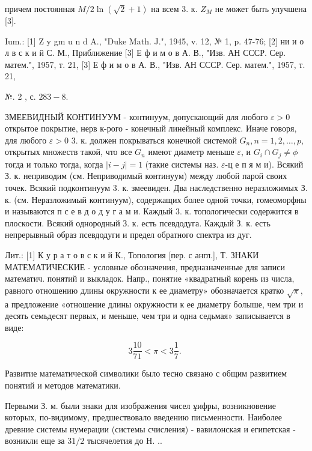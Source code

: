 \documentclass[10pt]{article}
\begin{document}
причем постоянная $M / 2 \ln (\sqrt{2}+1)$ на всем 3. к. $Z_{M}$ не может быть улучшена [3].



Ium.: [1] Z y gm u n d A., "Duke Math. J.", 1945, v. 12, № 1, p. 47-76; [2] ни и о л в с к и й С. М., Приближение [3] Е ф и м о в А. В., "Изв. АН СССР. Сер. матем.", 1957, т. 21, [3] Е ф и м о в А. В., "Изв. АН СССР. Сер. матем.", 1957, т. 21,

№. 2 , с. $283-8$.



ЗМЕЕВИДНЫЙ КОНТИНУУМ - континуум, допускающий для любого $\varepsilon>0$ открытое покрытие, нерв к-рого - конечный линейный комплекс. Иначе говоря, для любого $\varepsilon>0$ 3. к. должен покрываться конечной системой $G_{n}, n=1,2, \ldots, p$, открытых множеств такой, что все $G_{n}$ имеют диаметр меньше $\varepsilon$, и $G_{i} \cap G_{j} \neq \phi$ тогда и только тогда, когда $|i-j|=1$ (такие системы наз. $\varepsilon$-ц е п я м и). Всякий З. к. неприводим (см. Неприводимый континуум) между любой парой своих точек. Всякий подконтинуум 3. к. змеевиден. Два наследственно неразложимых З. к. (см. Неразложимый континуум), содержащих более одной точки, гомеоморфны и называются п с е в д о д у г а м и. Каждый 3. к. топологически содержится в плоскости. Всякий однородный З. к. есть псевдодуга. Каждый З. к. есть непрерывный образ псевдодуги и предел обратного спектра из дуг.



Лит.: [1] К у р а т о в с к и й К., Топология [пер. с англ.], Т. ЗНАКИ МАТЕМАТИЧЕСКИЕ - условные обозначения, предназначенные для записи математич. понятий и выкладок. Напр., понятие «квадратный корень из числа, равного отношению длины окружности к ее диаметру» обозначается кратко $\sqrt{\pi}$, а предложение «отношение длины окружности к ее диаметру болыше, чем три и десять семьдесят первых, и меньше, чем три и одна седьмая» записывается в виде:



\[

3 \frac{10}{71}<\pi<3 \frac{1}{7} \text {. }

\]



Развитие математической символики было тесно связано с общим развитием понятий и методов математики.



Первыми З. м. были знаки для изображения чисел ұифры, возникновение которых, по-видимому, предшествовало введению письменности. Наиболее древние системы нумерации (системы счисления) - вавилонская и египетская - возникли еще за $31 / 2$ тысячелетия до H. ..
\end{document}
